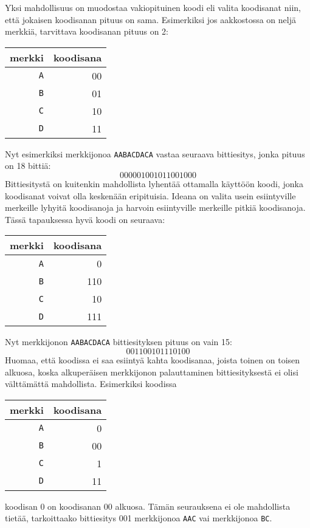 Yksi mahdollisuus on muodostaa vakiopituinen
koodi eli valita koodisanat niin,
että jokaisen koodisanan pituus on sama.
Esimerkiksi jos aakkostossa on neljä merkkiä,
tarvittava koodisanan pituus on 2:
\begin{center}
\begin{tabular}{rr}
merkki & koodisana \\
\hline
\texttt{A} & 00 \\
\texttt{B} & 01 \\
\texttt{C} & 10 \\
\texttt{D} & 11 \\
\end{tabular}
\end{center}
Nyt esimerkiksi merkkijonoa \texttt{AABACDACA}
vastaa seuraava bittiesitys, jonka pituus on 18 bittiä:
\[000001001011001000\]
Bittiesitystä on kuitenkin mahdollista lyhentää
ottamalla käyttöön koodi, jonka koodisanat voivat
olla keskenään eripituisia.
Ideana on valita usein esiintyville merkeille
lyhyitä koodisanoja ja harvoin esiintyville
merkeille pitkiä koodisanoja.
Tässä tapauksessa hyvä koodi on seuraava:
\begin{center}
\begin{tabular}{rr}
merkki & koodisana \\
\hline
\texttt{A} & 0 \\
\texttt{B} & 110 \\
\texttt{C} & 10 \\
\texttt{D} & 111 \\
\end{tabular}
\end{center}
Nyt merkkijonon \texttt{AABACDACA}
bittiesityksen pituus on vain 15:
\[001100101110100\]
Huomaa, että koodissa ei saa esiintyä kahta koodisanaa,
joista toinen on toisen alkuosa,
koska alkuperäisen merkkijonon palauttaminen
bittiesityksestä ei olisi välttämättä mahdollista.
Esimerkiksi koodissa
\begin{center}
\begin{tabular}{rr}
merkki & koodisana \\
\hline
\texttt{A} & 0 \\
\texttt{B} & 00 \\
\texttt{C} & 1 \\
\texttt{D} & 11 \\
\end{tabular}
\end{center}
koodisan 0 on koodisanan 00 alkuosa.
Tämän seurauksena ei ole mahdollista tietää, tarkoittaako bittiesitys
001 merkkijonoa \texttt{AAC} vai merkkijonoa \texttt{BC}.

